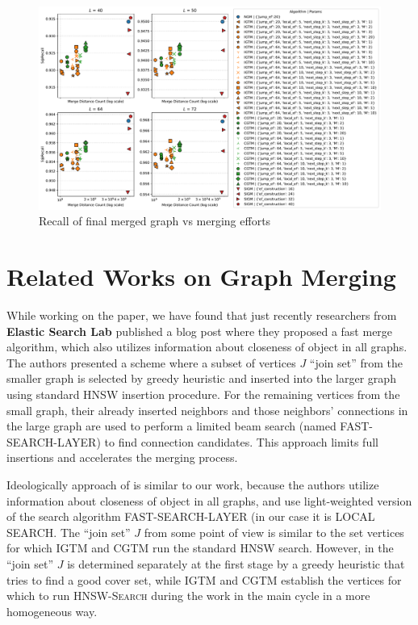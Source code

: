 \documentclass{article}
\begin{document}
\begin{figure}
  \centering
  \includegraphics[width=1.\linewidth]{figs/recall_vs_merge_distance_count.pdf}
  \caption{Recall of final merged graph vs merging efforts}
  \label{fig:recall_vs_merge}
\end{figure}


\section{Related Works on Graph Merging}
\label{sec:relatedworks}
While working on the paper, we have found that just recently researchers from \textbf{Elastic Search Lab} published a blog post \cite{ElasticHNSW2023} where they proposed a fast merge algorithm, which also utilizes information about closeness of object in all graphs. The authors presented a scheme where a subset of vertices $J$ ``join set'' from the smaller graph is selected by greedy heuristic and inserted into the larger graph using standard HNSW insertion procedure. For the remaining vertices from the small graph, their already inserted neighbors and those neighbors' connections in the large graph are used to perform a limited beam search (named FAST-SEARCH-LAYER) to find connection candidates. This approach limits full insertions and accelerates the merging process.

Ideologically approach of \cite{ElasticHNSW2023} is similar to our work, because the authors utilize information about closeness of object in all graphs, and use light-weighted version of the search algorithm FAST-SEARCH-LAYER (in our case it is \textsc{LOCAL SEARCH}. The ``join set'' $J$ from some point of view is similar to the set vertices for which \textsc{IGTM} and \textsc{CGTM} run the standard HNSW search. However, in \cite{ElasticHNSW2023} the ``join set'' $J$ is determined separately at the first stage by a greedy heuristic that tries to find a good cover set, while \textsc{IGTM} and \textsc{CGTM} establish the vertices for which to run \textsc{HNSW-Search} during the work in the main cycle in a more homogeneous way. 
\end{document}
